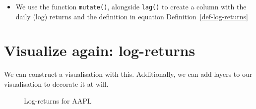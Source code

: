 \documentclass[
  12pt]{article}
\providecommand{\tightlist}{%
  \setlength{\itemsep}{0pt}\setlength{\parskip}{0pt}}\usepackage{longtable,booktabs,array}
\theoremstyle{definition}
\theoremstyle{remark}
\begin{document}
\begin{itemize}
\tightlist
\item
  We use the function \texttt{mutate()}, alongside \texttt{lag()} to
  create a column with the daily (log) returns and the definition in
  equation Definition~\ref{def-log-returns}
\end{itemize}

\section{Visualize again:
log-returns}\label{visualize-again-log-returns}

We can construct a visualisation with this. Additionally, we can add
layers to our visualisation to decorate it at will.

\begin{figure}


\caption{\label{fig-log-returns-aapl}Log-returns for AAPL}

\end{figure}%
\end{document}
